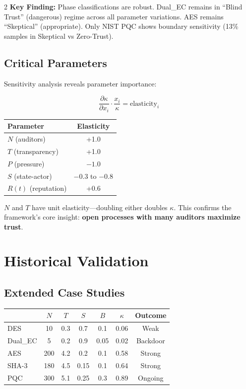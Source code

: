 \documentclass[11pt]{article}
\begin{document}
\begin{multicols}{2}
\textbf{Key Finding:} Phase classifications are robust. Dual\_EC remains in ``Blind Trust'' (dangerous) regime across all parameter variations. AES remains ``Skeptical'' (appropriate). Only NIST PQC shows boundary sensitivity (13\% samples in Skeptical vs Zero-Trust).

\subsection{Critical Parameters}

Sensitivity analysis reveals parameter importance:

\begin{equation}
\frac{\partial \kappa}{\partial x_i} \cdot \frac{x_i}{\kappa} = \text{elasticity}_i
\end{equation}

\begin{center}
\small
\begin{tabular}{@{}lc@{}}
\toprule
\textbf{Parameter} & \textbf{Elasticity} \\
\midrule
$N$ (auditors) & +1.0 \\
$T$ (transparency) & +1.0 \\
$P$ (pressure) & $-1.0$ \\
$S$ (state-actor) & $-0.3$ to $-0.8$ \\
$R(t)$ (reputation) & +0.6 \\
\bottomrule
\end{tabular}
\end{center}

$N$ and $T$ have unit elasticity---doubling either doubles $\kappa$. This confirms the framework's core insight: \textbf{open processes with many auditors maximize trust}.

\section{Historical Validation}

\subsection{Extended Case Studies}

\begin{center}
\small
\begin{tabular}{@{}lcccccc@{}}
\toprule
& $N$ & $T$ & $S$ & $B$ & $\kappa$ & \textbf{Outcome} \\
\midrule
DES & 10 & 0.3 & 0.7 & 0.1 & \textcolor{trustlow}{0.06} & Weak \\
Dual\_EC & 5 & 0.2 & 0.9 & 0.05 & \textcolor{trustlow}{0.02} & Backdoor \\
AES & 200 & 4.2 & 0.2 & 0.1 & \textcolor{trustmed}{0.58} & Strong \\
SHA-3 & 180 & 4.5 & 0.15 & 0.1 & \textcolor{trustmed}{0.64} & Strong \\
PQC & 300 & 5.1 & 0.25 & 0.3 & \textcolor{trusthigh}{0.89} & Ongoing \\
\bottomrule
\end{tabular}
\end{center}


\end{multicols}
\end{document}

